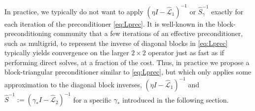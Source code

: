 \documentclass[review]{siamart}
\begin{document}
In practice, we typically do not want to apply $(\eta I - \widehat{\mathcal{L}}_1)^{-1}$
or $\widehat{S}_\gamma^{-1}$ exactly for each iteration of the preconditioner
\eqref{eq:Lprec}. It is well-known in the block-preconditioning community
that a few iterations of an effective preconditioner, such as multigrid,
to represent the inverse of diagonal blocks in \eqref{eq:Lprec} typically
yields convergence on the larger $2\times 2$ operator just as fast as if
performing direct solves, at a fraction of the cost. Thus, in practice we
propose a block-triangular preconditioner similar to \eqref{eq:Lprec}, but
which only applies some approximation to the diagonal block inverses,
$(\eta I - \widehat{\mathcal{L}}_1)^{-1}$ and
$\widehat{S}^{-1} := (\gamma_* I - \widehat{\mathcal{L}}_2)^{-1}$ for a
specific $\gamma_*$ introduced in the following section.
\end{document}

